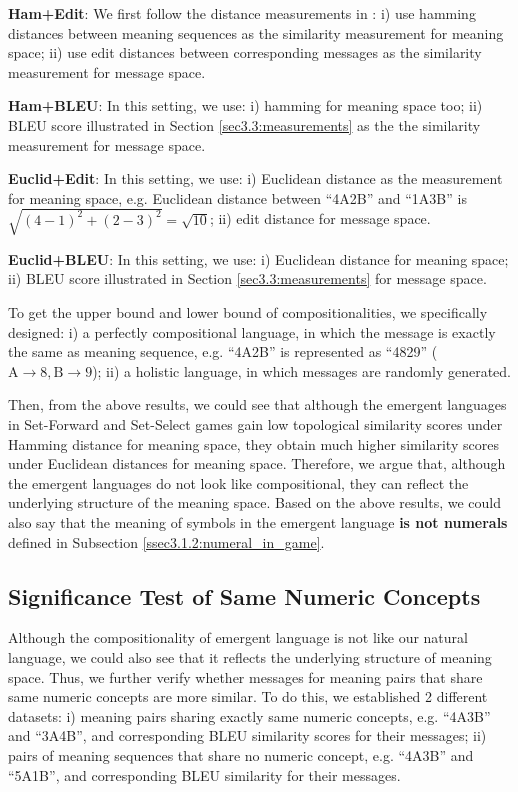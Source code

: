 \noindent\textbf{Ham+Edit}: We first follow the distance measurements in \cite{brighton2006understanding}: i) use hamming distances between meaning sequences as the similarity measurement for meaning space; ii) use edit distances between corresponding messages as the similarity measurement for message space.

\noindent\textbf{Ham+BLEU}: In this setting, we use: i) hamming for meaning space too; ii) BLEU score illustrated in Section \ref{sec3.3:measurements} as the the similarity measurement for message space.

\noindent\textbf{Euclid+Edit}: In this setting, we use: i) Euclidean distance as the measurement for meaning space, e.g. Euclidean distance between ``4A2B'' and ``1A3B'' is \\ $\sqrt{(4-1)^2 + (2-3)^2}=\sqrt{10}$; ii) edit distance for message space.

\noindent\textbf{Euclid+BLEU}: In this setting, we use: i) Euclidean distance for meaning space; ii) BLEU score illustrated in Section \ref{sec3.3:measurements} for message space.

To get the upper bound and lower bound of compositionalities, we specifically designed: i) a perfectly compositional language, in which the message is exactly the same as meaning sequence, e.g. ``4A2B'' is represented as ``4829'' ($\mbox{A}\rightarrow 8, \mbox{B} \rightarrow 9$); ii) a holistic language, in which messages are randomly generated.

Then, from the above results, we could see that although the emergent languages in Set-Forward and Set-Select games gain low topological similarity scores under Hamming distance for meaning space, they obtain much higher similarity scores under Euclidean distances for meaning space. Therefore, we argue that, although the emergent languages do not look like compositional, they can reflect the underlying structure of the meaning space. Based on the above results, we could also say that the meaning of symbols in the emergent language \textbf{is not numerals} defined in Subsection \ref{ssec3.1.2:numeral_in_game}. 

\subsection{Significance Test of Same Numeric Concepts}
\label{ssec4.2.3:significance_test}

Although the compositionality of emergent language is not like our natural language, we could also see that it reflects the underlying structure of meaning space. Thus, we further verify whether messages for meaning pairs that share same numeric concepts are more similar. To do this, we established 2 different datasets: i) meaning pairs sharing exactly same numeric concepts, e.g. ``4A3B'' and ``3A4B'', and corresponding BLEU similarity scores for their messages; ii) pairs of meaning sequences that share no numeric concept, e.g. ``4A3B'' and ``5A1B'', and corresponding BLEU similarity for their messages.

